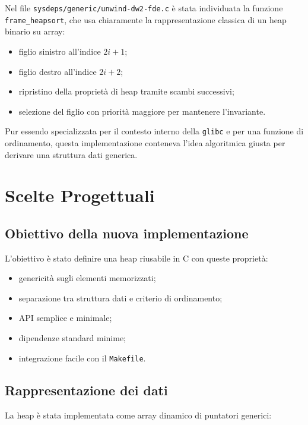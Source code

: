 \documentclass[a4paper,12pt]{article}
\begin{document}
Nel file \texttt{sysdeps/generic/unwind-dw2-fde.c} è stata individuata la funzione \texttt{frame\_heapsort}, che usa chiaramente la rappresentazione classica di un heap binario su array:

\begin{itemize}[leftmargin=*]
    \item figlio sinistro all'indice \(2i + 1\);
    \item figlio destro all'indice \(2i + 2\);
    \item ripristino della proprietà di heap tramite scambi successivi;
    \item selezione del figlio con priorità maggiore per mantenere l'invariante.
\end{itemize}

Pur essendo specializzata per il contesto interno della \texttt{glibc} e per una funzione di ordinamento, questa implementazione conteneva l'idea algoritmica giusta per derivare una struttura dati generica.

\section{Scelte Progettuali}

\subsection{Obiettivo della nuova implementazione}

L'obiettivo è stato definire una heap riusabile in C con queste proprietà:

\begin{itemize}[leftmargin=*]
    \item genericità sugli elementi memorizzati;
    \item separazione tra struttura dati e criterio di ordinamento;
    \item API semplice e minimale;
    \item dipendenze standard minime;
    \item integrazione facile con il \texttt{Makefile}.
\end{itemize}

\subsection{Rappresentazione dei dati}

La heap è stata implementata come array dinamico di puntatori generici:
\end{document}
